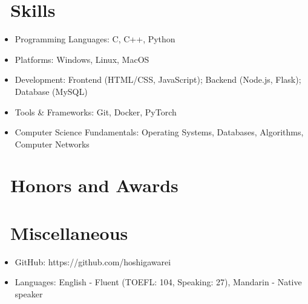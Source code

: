 \documentclass{resume}
\begin{document}


\section{\faCogs\ Skills}
\begin{itemize}[parsep=0.5ex]
  \item Programming Languages: C, C++, Python
  \item Platforms: Windows, Linux, MacOS
  \item Development: Frontend (HTML/CSS, JavaScript); Backend (Node.js, Flask); Database (MySQL)
  \item Tools \& Frameworks: Git, Docker, PyTorch
  \item Computer Science Fundamentals: Operating Systems, Databases, Algorithms, Computer Networks
\end{itemize}

\section{\faHeartO\ Honors and Awards}

\section{\faInfo\ Miscellaneous}
\begin{itemize}[parsep=0.5ex]
  \item GitHub: https://github.com/hoshigawarei
  \item Languages: English - Fluent (TOEFL: 104, Speaking: 27), Mandarin - Native speaker
\end{itemize}

%
%
\end{document}
